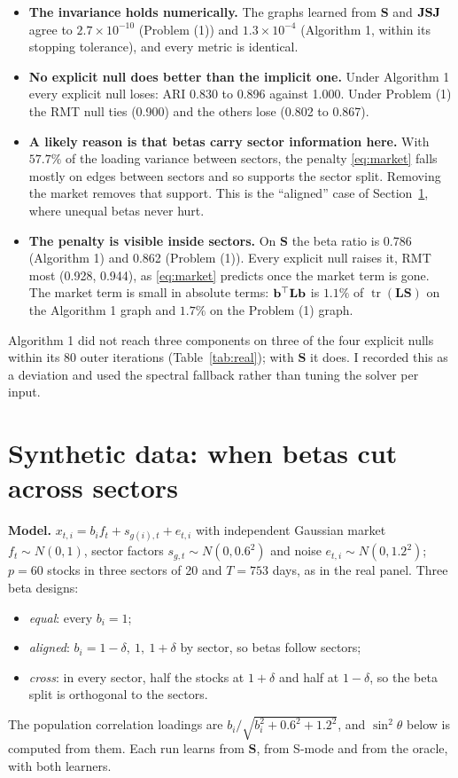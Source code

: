 \documentclass[11pt,a4paper]{article}
\newcommand{\Lap}{\mathbf{L}}
\newcommand{\Smat}{\mathbf{S}}
\newcommand{\tr}{\operatorname{tr}}
\theoremstyle{remark}
\begin{document}
\begin{itemize}
\item \textbf{The invariance holds numerically.} The graphs learned from $\Smat$ and
  $\Jmat\Smat\Jmat$ agree to $2.7\times10^{-10}$ (Problem (1)) and $1.3\times10^{-4}$
  (Algorithm 1, within its stopping tolerance), and every metric is identical.
\item \textbf{No explicit null does better than the implicit one.} Under Algorithm 1
  every explicit null loses: ARI 0.830 to 0.896 against 1.000. Under Problem (1) the RMT
  null ties (0.900) and the others lose (0.802 to 0.867).
\item \textbf{A likely reason is that betas carry sector information here.} With
  $57.7\%$ of the loading variance between sectors, the penalty \eqref{eq:market} falls
  mostly on edges between sectors and so supports the sector split. Removing the market
  removes that support. This is the ``aligned'' case of Section~\ref{sec:synthetic},
  where unequal betas never hurt.
\item \textbf{The penalty is visible inside sectors.} On $\Smat$ the beta ratio is
  0.786 (Algorithm 1) and 0.862 (Problem (1)). Every explicit null raises it, RMT most
  (0.928, 0.944), as \eqref{eq:market} predicts once the market term is gone. The
  market term is small in absolute terms: $\bvec^\top\Lap\bvec$ is $1.1\%$ of
  $\tr(\Lap\Smat)$ on the Algorithm 1 graph and $1.7\%$ on the Problem (1) graph.
\end{itemize}
Algorithm 1 did not reach three components on three of the four explicit nulls within
its 80 outer iterations (Table~\ref{tab:real}); with $\Smat$ it does. I recorded this
as a deviation and used the spectral fallback rather than tuning the solver per input.

\section{Synthetic data: when betas cut across sectors}\label{sec:synthetic}

\textbf{Model.} $x_{t,i}=b_if_t+s_{g(i),t}+e_{t,i}$ with independent Gaussian market
$f_t\sim N(0,1)$, sector factors $s_{g,t}\sim N(0,0.6^2)$ and noise
$e_{t,i}\sim N(0,1.2^2)$; $p=60$ stocks in three sectors of 20 and $T=753$ days, as in
the real panel. Three beta designs:
\begin{itemize}
\item \emph{equal}: every $b_i=1$;
\item \emph{aligned}: $b_i=1-\delta,\ 1,\ 1+\delta$ by sector, so betas follow sectors;
\item \emph{cross}: in every sector, half the stocks at $1+\delta$ and half at
  $1-\delta$, so the beta split is orthogonal to the sectors.
\end{itemize}
The population correlation loadings are $b_i/\sqrt{b_i^2+0.6^2+1.2^2}$, and
$\sin^2\theta$ below is computed from them. Each run learns from $\Smat$, from S-mode
and from the oracle, with both learners.
\end{document}
